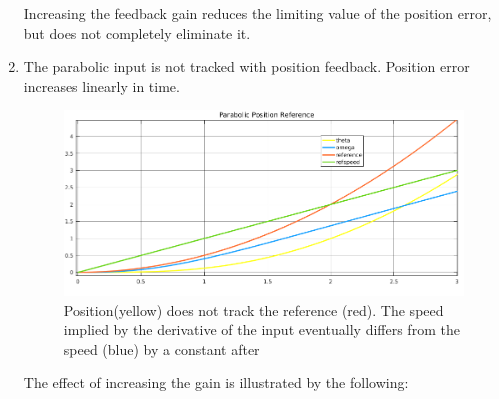 \documentclass[11pt,a4paper]{article}
\begin{document}
\begin{enumerate}
	Increasing the feedback gain reduces the limiting value of the position error, but does not completely eliminate it.
	
	\item The parabolic input is not tracked with position feedback. Position error increases linearly in time.
	
	\begin{figure}[!htbp]
	\includegraphics[width=\textwidth]{imglab/lab4sol_parapostraj.png}
	\caption{Position(yellow) does not track the reference (red). The speed implied by the derivative of the input eventually differs from the speed (blue) by a constant after}
	\end{figure}	
	
	The effect of increasing the gain is illustrated by the following:
	

\end{enumerate}
\end{document}
